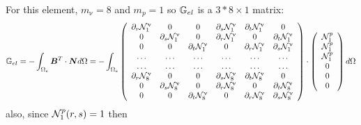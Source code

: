 For this element, $m_\upnu=8$ and $m_p=1$ so ${\mathbb{G}}_{el}$ is
a $3*8\times 1$ matrix:
\[
{\mathbb{G}}_{el} = -\int_{\Omega_e} {\bm B}^T \cdot {\bm N} d\Omega
= -\int_{\Omega_e}
\left(
\begin{array}{cccccc}
\partial_r {\mathcal{N}}_1^\upnu & 0 & 0 & \partial_s {\mathcal{N}}_1^\upnu  & \partial_t {\mathcal{N}}_1^\upnu & 0 \\
0 & \partial_s {\mathcal{N}}_1^\upnu  & 0 & \partial_r {\mathcal{N}}_1^\upnu  & 0 & \partial_t {\mathcal{N}}_1^\upnu \\
0 & 0 & \partial_t {\mathcal{N}}_1^\upnu  & 0 & \partial_r {\mathcal{N}}_1^\upnu  & \partial_s {\mathcal{N}}_1^\upnu \\
\dots  & \dots & \dots  & \dots & \dots  & \dots \\
\dots  & \dots & \dots  & \dots & \dots  & \dots \\
\partial_r {\mathcal{N}}_8^\upnu & 0 & 0 & \partial_s {\mathcal{N}}_8^\upnu  & \partial_t {\mathcal{N}}_8^\upnu & 0 \\
0 & \partial_s {\mathcal{N}}_8^\upnu  & 0 & \partial_r {\mathcal{N}}_8^\upnu  & 0 & \partial_t {\mathcal{N}}_8^\upnu \\
0 & 0 & \partial_t {\mathcal{N}}_8^\upnu  & 0 & \partial_r {\mathcal{N}}_8^\upnu  & \partial_s {\mathcal{N}}_8^\upnu 
\end{array}
\right)
\cdot
\left(
\begin{array}{c}
{\mathcal{N}}_1^p  \\ 
{\mathcal{N}}_1^p  \\ 
{\mathcal{N}}_1^p  \\ 
0 \\
0 \\
0 
\end{array}
\right)
d\Omega
\]
also, since ${\mathcal{N}}_1^p(r,s)=1$ then
